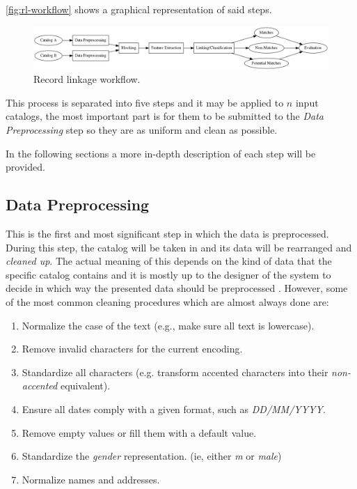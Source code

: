 \documentclass[epsfig,a4paper,11pt,titlepage,twoside,openany]{book}
\begin{document}
\autoref{fig:rl-workflow} shows a graphical representation of said steps.

\begin{figure}[H]
  \centering \includegraphics[width=\textwidth]{rl-workflow}
  \caption{Record linkage workflow.}
  \label{fig:rl-workflow}
\end{figure}

This process is separated into five steps and it may be applied to $n$ input catalogs, the most important part is for them to be submitted to the \textit{Data Preprocessing} step so they are as uniform and clean as possible. 



In the following sections a more in-depth description of each step will be provided.


\subsection{Data Preprocessing}
\label{sec:rl-workflow-data-preprocessing}

This is the first and most significant step in which the data is preprocessed. During this step, the catalog will be taken in and its data will be rearranged and \textit{cleaned up}. The actual meaning of this depends on the kind of data that the specific catalog
contains and it is mostly up to the designer of the system to decide in which way the presented data
should be preprocessed \cite{Rahm00datacleaning}. 
However, some of the most common cleaning procedures which are almost always done are:

\begin{enumerate}
\item Normalize the case of the text (e.g., make sure all text is lowercase).
\item Remove invalid characters for the current encoding.
\item Standardize all characters (e.g. transform accented characters into their
  \textit{non-accented} equivalent).
\item Ensure all dates comply with a given format, such as \textit{DD/MM/YYYY}.
\item Remove empty values or fill them with a default value.
\item Standardize the \textit{gender} representation. (ie, either \textit{m} or
  \textit{male})
\item Normalize names and addresses. \cite{Churches2002}
\end{enumerate}
\end{document}
